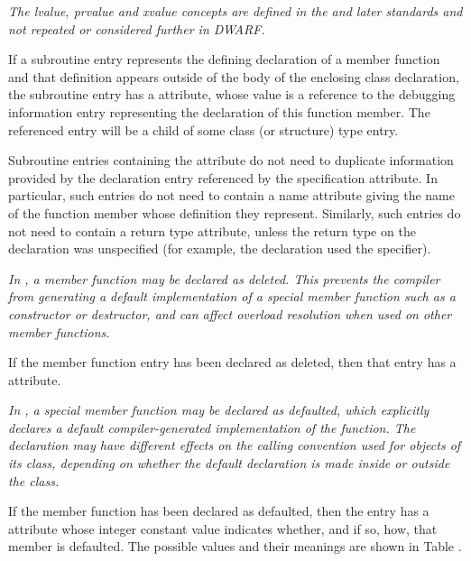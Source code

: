 \textit{The lvalue, prvalue and xvalue concepts are defined in the
 and later standards and not repeated or
considered further in DWARF.}

If a subroutine entry represents the defining declaration
of a member function and that definition appears outside of
the body of the enclosing class declaration, the subroutine
entry has a 
\DWATspecification{} attribute, 
whose value is
a reference to the debugging information entry representing
the declaration of this function member. The referenced entry
will be a child of some class (or structure) type entry.

Subroutine entries containing the
\DWATspecification{} attribute 
do not need to duplicate information provided
by the declaration entry referenced by the specification
attribute. In particular, such entries do not need to contain
a name attribute giving the name of the function member whose 
definition they represent.  
Similarly, such entries do not need to contain a return type 
attribute, unless the return type on the declaration was 
unspecified (for example, the declaration used the 
 \autoreturntype{} specifier).

\textit{In , a member function may be declared 
as deleted. This prevents the compiler from generating a default
implementation of a special member function such as a
constructor or destructor, and can affect overload resolution
when used on other member functions.}

If the member function entry has been declared as deleted,
\hypertarget{chap:DWATdeleted}{}
then that entry has a \DWATdeletedNAME{}
attribute.

\textit{In , a special member function may be 
declared as defaulted, which explicitly declares a default
compiler-generated implementation of the function. The
declaration may have different effects on the calling
convention used for objects of its class, depending on
whether the default declaration is made inside or outside the
class.}

If the member function has been declared as defaulted, 
then the entry has a \DWATdefaultedNAME{}
attribute
whose integer constant value indicates whether, and if so,
how, that member is defaulted. The possible values and
their meanings are shown in 
Table .


